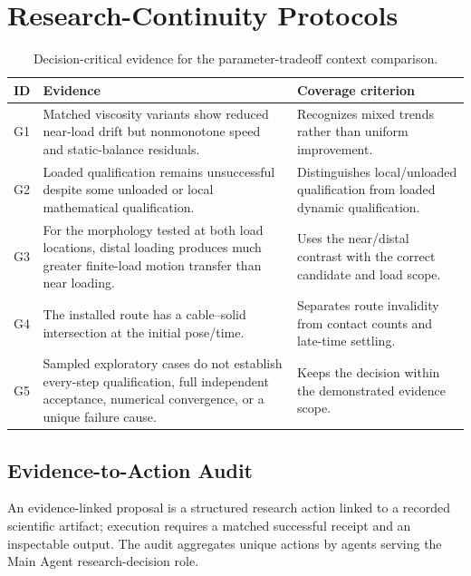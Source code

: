 \section{Research-Continuity Protocols}
\label{app:architecture-ablations}

\begin{table}[!t]
\centering
\caption{Decision-critical evidence for the parameter-tradeoff context comparison.}
\label{tab:context-evidence-checklist}
\papertablestyle
\begin{tabularx}{\textwidth}{@{}p{}>{\raggedright\arraybackslash}p{}Y@{}}
\toprule
\textbf{ID} & \textbf{Evidence} & \textbf{Coverage criterion} \\
\midrule
G1 & Matched viscosity variants show reduced near-load drift but nonmonotone speed and static-balance residuals. & Recognizes mixed trends rather than uniform improvement. \\
G2 & Loaded qualification remains unsuccessful despite some unloaded or local mathematical qualification. & Distinguishes local/unloaded qualification from loaded dynamic qualification. \\
G3 & For the morphology tested at both load locations, distal loading produces much greater finite-load motion transfer than near loading. & Uses the near/distal contrast with the correct candidate and load scope. \\
G4 & The installed route has a cable--solid intersection at the initial pose/time. & Separates route invalidity from contact counts and late-time settling. \\
G5 & Sampled exploratory cases do not establish every-step qualification, full independent acceptance, numerical convergence, or a unique failure cause. & Keeps the decision within the demonstrated evidence scope. \\
\bottomrule
\end{tabularx}
\end{table}

\subsection{Evidence-to-Action Audit}
\label{app:evidence-action-audit}
An evidence-linked proposal is a structured research action linked to a recorded scientific artifact; execution requires a matched successful receipt and an inspectable output. The audit aggregates unique actions by agents serving the Main Agent research-decision role.


